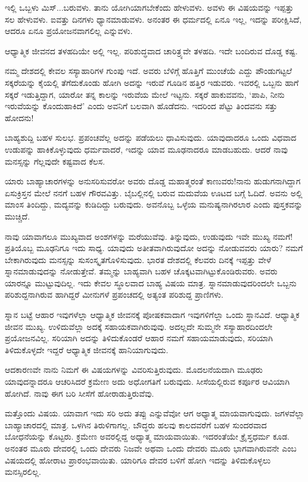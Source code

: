 ಇಲ್ಲಿ ಒಬ್ಬಳು ಮಿಸ್...ಬರುವಳು. ತಾನು ಯೋಗಿಯಾಗಬೇಕೆಂದು ಹೇಳುವಳು. ಅವಳು ಈ ವಿಷಯವನ್ನು ಇಪ್ಪತ್ತು ಸಲ ಹೇಳುವಳು. ಐವತ್ತು ದಿನಗಳು ಧ್ಯಾನಮಾಡುವಳು. ಅನಂತರ ಈ ಧರ್ಮದಲ್ಲಿ ಏನೂ ಇಲ್ಲ, ಇದನ್ನು ಪರೀಕ್ಷಿಸಿದೆ, ಆದರೂ ಏನೂ ಪ್ರಯೋಜನವಾಗಲಿಲ್ಲ ಎನ್ನುವಳು.

ಆಧ್ಯಾತ್ಮಿಕ ಜೀವನದ ತಳಹದಿಯೇ ಅಲ್ಲಿ ಇಲ್ಲ. ಪರಿಶುದ್ಧವಾದ ಚಾರಿತ್ರ್ಯವೇ ತಳಹದಿ. ಇದೇ ಬಂದಿರುವ ದೊಡ್ಡ ಕಷ್ಟ.

ನಮ್ಮ ದೇಶದಲ್ಲಿ ಕೇವಲ ಸಸ್ಯಾಹಾರಿಗಳ ಗುಂಪು ಇದೆ. ಅವರು ಬೆಳಿಗ್ಗೆ ಹೊತ್ತಿಗೆ ಮುಂಚೆಯೆ ಎದ್ದು ಪೌಂಡುಗಟ್ಟಲೆ ಸಕ್ಕರೆಯನ್ನು ಕೈಯಲ್ಲಿ ತೆಗೆದುಕೊಂಡು ಹೋಗಿ ಅದನ್ನು ಇರುವೆ ಗೂಡಿನ ಹತ್ತಿರ ಇಡುವರು. ಇವರಲ್ಲಿ ಒಬ್ಬನು ಹಾಗೆ ಸಕ್ಕರೆ ಇಡುತ್ತಿದ್ದಾಗ, ಯಾರೋ ತನ್ನ ಕಾಲನ್ನು ಇರುವೆಯ ಮೇಲೆ ಇಟ್ಟನು. ಸಕ್ಕರೆ ಹಾಕುವವನು, `ಪಾಪಿ, ನೀನು ಇರುವೆಯನ್ನು ಕೊಂದುಹಾಕಿದೆ' ಎಂದು ಅವನಿಗೆ ಬಲವಾಗಿ ಹೊಡೆದನು. ಇದರಿಂದ ಪೆಟ್ಟು ತಿಂದವನು ಸತ್ತು ಹೋದನು!

ಬಾಹ್ಯಶುದ್ದಿ ಬಹಳ ಸುಲಭ. ಪ್ರಪಂಚವೆಲ್ಲ ಅದನ್ನು ಪಡೆಯಲು ಧಾವಿಸುವುದು. ಯಾವುದಾದರೂ ಒಂದು ವಿಧವಾದ ಉಡುಪನ್ನು ಹಾಕಿಕೊಳ್ಳುವುದು ಧರ್ಮವಾದರೆ, ಇದನ್ನು ಯಾವ ಮೂಢನಾದರೂ ಮಾಡಬಹುದು. ಆದರೆ ನಾವು ಮನಸ್ಸನ್ನು ಗೆಲ್ಲವುದೇ ಕಷ್ಟವಾದ ಕೆಲಸ.

ಯಾರು ಬಾಹ್ಯಾಚಾರಗಳನ್ನು ಅನುಸರಿಸುವರೋ ಅವರು ದೊಡ್ಡ ಮಹಾತ್ಮರಂತೆ ಕಾಣುವರು!ನಾನು ಹುಡುಗನಾಗಿದ್ದಾಗ ಏಸುಕ್ರಿಸ್ತನ ಮೇಲೆ ನನಗೆ ಬಹಳ ಗೌರವವಿತ್ತು. ಬೈಬಲ್ಲಿನಲ್ಲಿ ಬರುವ ಮದುವೆಯ ಊಟದ ಬಗ್ಗೆ ಓದಿದೆ. ಅವನು ಅಲ್ಲಿ ಮಾಂಸ ತಿಂದಿದ್ದು, ಮದ್ಯವನ್ನು ಕುಡಿದಿದ್ದು ಬರುವುದು. ಅವನೊಬ್ಬ ಒಳ್ಳೆಯ ಮನುಷ್ಯನಾಗಿರಲಾರ ಎಂದು ಪುಸ್ತಕವನ್ನು ಮುಚ್ಚಿದೆ.

ನಾವು ಯಾವಾಗಲೂ ಮುಖ್ಯವಾದ ಅಂಶಗಳನ್ನು ಮರೆಯುವೆವು. ತಿನ್ನುವುದು, ಉಡುವುದು ಇವೇ ಮುಖ್ಯ ನಮಗೆ! ಪ್ರತಿಯೊಬ್ಬ ಮೂಢನಿಗೂ ಇದು ಸಾಧ್ಯ. ಯಾವುದು ಅತೀತವಾಗಿರುವುದೋ ಅದನ್ನು ನೋಡುವವರು ಯಾರು? ನಮಗೆ ಬೇಕಾಗಿರುವುದು ಮನಸ್ಸನ್ನು ಸುಸಂಸ್ಕೃತಗೊಳಿಸುವುದು. ಭಾರತ ದೇಶದಲ್ಲಿ ಕೆಲವರು ದಿನಕ್ಕೆ ಇಪ್ಪತ್ತು ವೇಳೆ ಸ್ನಾನಮಾಡುವುದನ್ನು ನೋಡುತ್ತೇವೆ. ತಮ್ಮನ್ನು ಬಾಹ್ಯವಾಗಿ ಬಹಳ ಚೊಕ್ಕಟವಾಗಿಟ್ಟುಕೊಂಡಿರುವರು. ಅವರು ಯಾರನ್ನೂ ಮುಟ್ಟುವುದಿಲ್ಲ. ಇದು ಕೇವಲ ಸ್ಥೂಲವಾದ ಬಾಹ್ಯ ವಿಷಯ ಮಾತ್ರ. ಸ್ನಾನಮಾಡುವುದರಿಂದಲೇ ಒಬ್ಬನು ಪರಿಶುದ್ದನಾಗಿರುವ ಹಾಗಿದ್ದರೆ ಮೀನುಗಳೆ ಪ್ರಪಂಚದಲ್ಲಿ ಅತ್ಯಂತ ಪರಿಶುದ್ದ ಪ್ರಾಣಿಗಳು.

ಸ್ನಾನ ಬಟ್ಟೆ ಆಹಾರ ಇವುಗಳೆಲ್ಲಾ ಆಧ್ಯಾತ್ಮಿಕ ಜೀವನಕ್ಕೆ ಪೋಷಕವಾದಾಗ ಇವುಗಳಿಗೆಲ್ಲಾ ಒಂದು ಸ್ಥಾನವಿದೆ. ಆಧ್ಯಾತ್ಮಿಕ ಜೀವನ ಮುಖ್ಯ. ಉಳಿದುವೆಲ್ಲಾ ಅದಕ್ಕೆ ಸಹಾಯಕವಾಗಿರುವುವು. ಅದಲ್ಲದೇ ಸುಮ್ಮನೇ ಸಸ್ಯಾಹಾರದಿಂದಲೇ ಪ್ರಯೋಜನವಿಲ್ಲ. ಸರಿಯಾಗಿ ಅದನ್ನು ತಿಳಿದುಕೊಂಡರೆ ಆಹಾರ ನಮಗೆ ಸಹಾಯಮಾಡುವುದು, ಸರಿಯಾಗಿ ತಿಳಿದುಕೊಳ್ಳದೇ ಇದ್ದರೆ ಆಧ್ಯಾತ್ಮಿಕ ಜೀವನಕ್ಕೆ ಹಾನಿಯಾಗುವುದು.

ಆದಕಾರಣವೇ ನಾನು ನಿಮಗೆ ಈ ವಿಷಯಗಳನ್ನು ವಿವರಿಸುತ್ತಿರುವುದು. ಮೊದಲನೆಯದಾಗಿ ಮೂಢರು ಯಾವುದನ್ನಾದರೂ ಆಚರಿಸಿದರೆ ಕ್ರಮೇಣ ಅದು ಅಧೋಗತಿಗೆ ಬರುವುದು. ಸೀಸೆಯಲ್ಲಿರುವ ಕರ್ಪೂರ ಆವಿಯಾಗಿ ಹೋಗಿದೆ. ನಾವು ಈಗ ಬರಿ ಸೀಸೆಗೆ ಹೋರಾಡುತ್ತಿರುವೆವು.

ಮತ್ತೊಂದು ವಿಷಯ. ಯಾವಾಗ ಇದು ಸರಿ ಅದು ತಪ್ಪು ಎನ್ನುವೆವೋ ಆಗ ಅಧ್ಯಾತ್ಮ ಮಾಯವಾಗುವುದು. ಜಗಳವೆಲ್ಲಾ ಬಾಹ್ಯಾಚಾರದಲ್ಲಿ ಮಾತ್ರ. ಒಳಗಿನ ತಿರುಳಿಗಾಗಲ್ಲ. ಬೌದ್ಧರು ಹಲವು ಕಾಲದವರೆಗೆ ಬಹಳ ಸುಂದರವಾದ ಬೋಧನೆಯನ್ನು ಕೊಟ್ಟರು. ಕ್ರಮೇಣ ಅವರಲ್ಲಿದ್ದ ಅಧ್ಯಾತ್ಮ ಮಾಯವಾಯಿತು. ಇದರಂತೆಯೇ ಕ್ರೈಸ್ತಧರ್ಮ ಕೂಡ. ಅನಂತರ ಮೂರು ದೇವರಲ್ಲಿ ಒಂದು ದೇವರು ನಿಜವೇ ಅಥವಾ ಒಂದು ದೇವರು ಮೂರು ಭಾಗವಾಗಿರುವನೇ ಎಂಬ ವಿಷಯದಲ್ಲಿ ಹೋರಾಟ ಪ್ರಾರಂಭವಾಯಿತು. ಯಾರಿಗೂ ದೇವರ ಬಳಿಗೆ ಹೋಗಿ ಇದನ್ನು ತಿಳಿದುಕೊಳ್ಳಲು ಮನಸ್ಸಿರಲಿಲ್ಲ.

